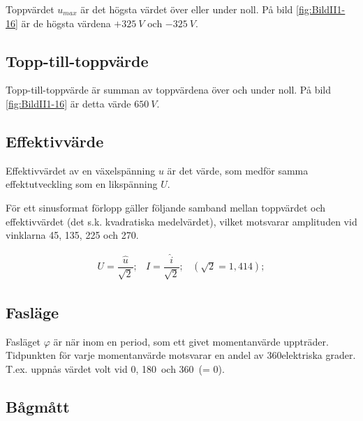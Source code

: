 Toppvärdet \(u_{max}\) är det högsta värdet över eller under noll.
På bild \ref{fig:BildII1-16} är de högsta värdena \(+325\ V\) och \(-325\ V\).

\subsection{Topp-till-toppvärde}

Topp-till-toppvärde är summan av toppvärdena över och under noll.
På bild \ref{fig:BildII1-16} är detta värde \(650\ V\).

\subsection{Effektivvärde}

Effektivvärdet av en växelspänning \(u\) är det värde, som medför samma
effektutveckling som en likspänning \(U\).

För ett sinusformat förlopp gäller följande samband mellan toppvärdet och
effektivvärdet (det s.k. kvadratiska medelvärdet), vilket motsvarar amplituden
vid vinklarna 45, 135, 225 och 270\degree.

\begin{equation*}
	\begin{array}{lllll}
	U=\dfrac{\hat{u}}{\sqrt{2}}; & I=\dfrac{\hat{i}}{\sqrt{2}}; & (\sqrt{2} = 1,414);
	\end{array}
\end{equation*}

\subsection{Fasläge}

Fasläget \(\varphi\) är när inom en period, som ett givet momentanvärde
uppträder.
Tidpunkten för varje momentanvärde motsvarar en andel av 360\degree elektriska
grader.
T.ex. uppnås värdet volt vid 0\degree, 180\degree~och 360\degree~(= 0\degree).

\subsection{Bågmått}

